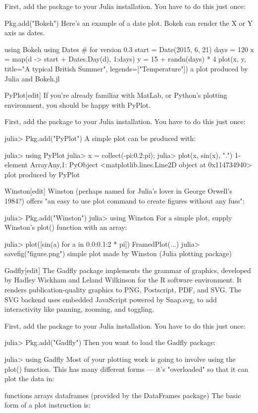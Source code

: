 First, add the package to your Julia installation. You have to do this just once:

Pkg.add("Bokeh")
Here's an example of a date plot. Bokeh can render the X or Y axis as dates.

using Bokeh
using Dates # for version 0.3
start = Date(2015, 6, 21)
days = 120
x = map(d -> start + Dates.Day(d), 1:days)
y = 15 + randn(days) * 4
plot(x, y, title="A typical British Summer", legends=["Temperature"])
a plot produced by Julia and Bokeh.jl

PyPlot[edit]
If you're already familiar with MatLab, or Python's plotting environment, you should be happy with PyPlot.

First, add the package to your Julia installation. You have to do this just once:

julia> Pkg.add("PyPlot")
A simple plot can be produced with:

julia> using PyPlot
julia> x = collect(-pi:0.2:pi);
julia> plot(x, sin(x), ".")
1-element Array{Any,1}:
 PyObject <matplotlib.lines.Line2D object at 0x114734940>
plot produced by PyPlot

Winston[edit]
Winston (perhaps named for Julia's lover in George Orwell's 1984?) offers "an easy to use plot command to create figures without any fuss":

julia> Pkg.add("Winston")
julia> using Winston
For a simple plot, supply Winston's plot() function with an array:

julia> plot([sin(a) for a in 0.0:0.1:2 * pi])
FramedPlot(...)
julia> savefig("figure.png")
simple plot made by Winston (Julia plotting package)

Gadfly[edit]
The Gadfly package implements the grammar of graphics, developed by Hadley Wickham and Leland Wilkinson for the R software environment. It renders publication-quality graphics to PNG, Postscript, PDF, and SVG. The SVG backend uses embedded JavaScript powered by Snap.svg, to add interactivity like panning, zooming, and toggling.

First, add the package to your Julia installation. You have to do this just once:

julia> Pkg.add("Gadfly")
Then you want to load the Gadfly package:

julia> using Gadfly
Most of your plotting work is going to involve using the plot() function. This has many different forms — it's "overloaded" so that it can plot the data in:

functions
arrays
dataframes (provided by the DataFrames package)
The basic form of a plot instruction is:

